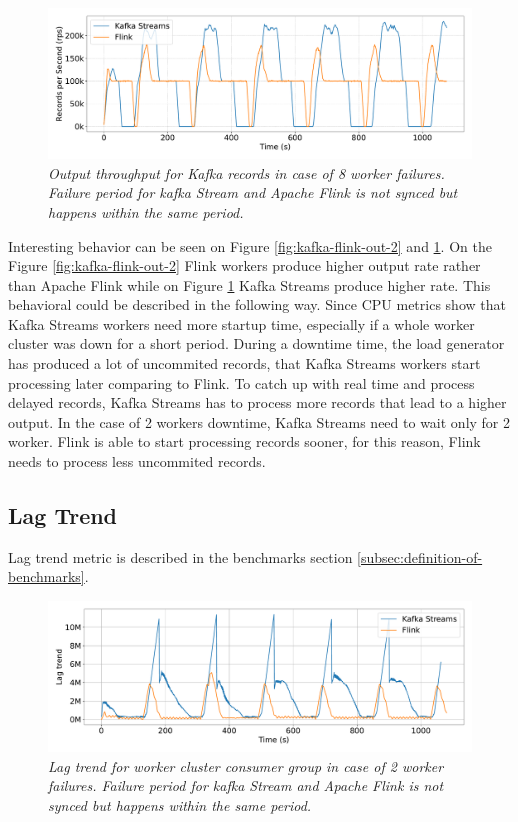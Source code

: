 \begin{figure}[H]
    \centering
    \includegraphics[width=1\textwidth]{figures/kafka-flink/output-throught-8pods-kafka-flink}
    \caption{\textit{Output throughput for Kafka records in case of 8 worker failures.
    Failure period for kafka Stream and Apache Flink is not synced but happens within the same period.}}
    \label{fig:kafka-flink-out-8}
\end{figure}

Interesting behavior can be seen on Figure \ref{fig:kafka-flink-out-2} and \ref{fig:kafka-flink-out-8}.
On the Figure \ref{fig:kafka-flink-out-2} Flink workers produce higher output rate
rather than Apache Flink while on Figure \ref{fig:kafka-flink-out-8} Kafka Streams produce
higher rate.
This behavioral could be described in the following way.
Since CPU metrics show that Kafka Streams workers need more startup time, especially
if a whole worker cluster was down for a short period.
During a downtime time, the load generator has produced a lot of uncommited records,
that Kafka Streams workers start processing later comparing to Flink.
To catch up with real time and process delayed records, Kafka Streams has to process
more records that lead to a higher output.
In the case of 2 workers downtime, Kafka Streams need to wait only for 2 worker.
Flink is able to start processing records sooner, for this reason, Flink needs to
process less uncommited records.

\newpage
\subsection{Lag Trend}\label{subsec:lag-trend}
Lag trend metric is described in the benchmarks section \ref{subsec:definition-of-benchmarks}.

\begin{figure}[H]
    \centering
    \includegraphics[width=1\textwidth]{figures/kafka-flink/lag-trend-2pod-kafka-flink}
    \caption{\textit{Lag trend for worker cluster consumer group in case of 2 worker failures.
    Failure period for kafka Stream and Apache Flink is not synced but happens within the same period.}}
    \label{fig:kafka-flink-lag-2}
\end{figure}


